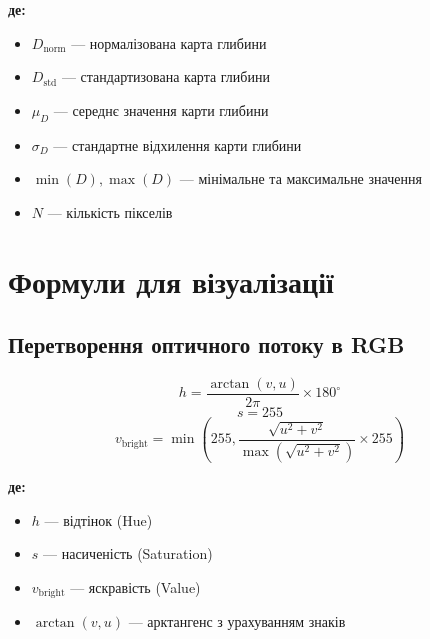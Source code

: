 \documentclass[14pt, a4paper]{extarticle}
\numberwithin{equation}{section}
\begin{document}
\textbf{де:}
\begin{itemize}
\item $D_{\text{norm}}$ — нормалізована карта глибини
\item $D_{\text{std}}$ — стандартизована карта глибини
\item $\mu_D$ — середнє значення карти глибини
\item $\sigma_D$ — стандартне відхилення карти глибини
\item $\min(D), \max(D)$ — мінімальне та максимальне значення
\item $N$ — кількість пікселів
\end{itemize}

\newpage

\section{Формули для візуалізації}

\subsection{Перетворення оптичного потоку в RGB}

\begin{equation}
\boxed{h = \frac{\arctan(v, u)}{2\pi} \times 180^\circ} \tag{79}
\end{equation}
\begin{equation}
\boxed{s = 255} \tag{80}
\end{equation}
\begin{equation}
\boxed{v_{\text{bright}} = \min\left(255, \frac{\sqrt{u^2 + v^2}}{\max(\sqrt{u^2 + v^2})} \times 255\right)} \tag{81}
\end{equation}

\textbf{де:}
\begin{itemize}
\item $h$ — відтінок (Hue)
\item $s$ — насиченість (Saturation)
\item $v_{\text{bright}}$ — яскравість (Value)
\item $\arctan(v, u)$ — арктангенс з урахуванням знаків
\end{itemize}
\end{document}
